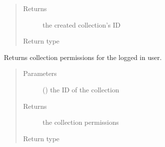 \documentclass[letterpaper,10pt,english]{sphinxmanual}
\begin{document}
\begin{fulllineitems}
\begin{fulllineitems}
\begin{quote}
\begin{description}
\item[{Returns}] \leavevmode
\sphinxAtStartPar
the created collection’s ID

\item[{Return type}] \leavevmode
\sphinxAtStartPar
{}

\end{description}\end{quote}

\end{fulllineitems}


\begin{fulllineitems}
\label{\detokenize{autoapi/pine/client/index:pine.client.PineClient.get_collection_permissions}}
\sphinxAtStartPar
Returns collection permissions for the logged in user.
\begin{quote}\begin{description}
\item[{Parameters}] \leavevmode
\sphinxAtStartPar
{} () \textendash{} the ID of the collection

\item[{Returns}] \leavevmode
\sphinxAtStartPar
the collection permissions

\item[{Return type}] \leavevmode
\sphinxAtStartPar
{\hyperref[\detokenize{autoapi/pine/client/models/index:pine.client.models.CollectionUserPermissions}]{}}

\end{description}\end{quote}

\end{fulllineitems}


\end{fulllineitems}
\end{document}
